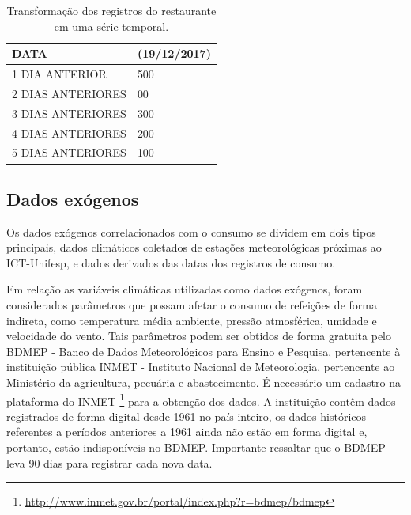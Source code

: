             \begin{table}[!ht]
                \centering
                \begin{tabular}{l|l}
                \hline
                    DATA                  & (19/12/2017) \\ \hline
                1 DIA ANTERIOR    & 500        \\
                2 DIAS ANTERIORES & 00                            \\
                3 DIAS ANTERIORES & 300                            \\
                4 DIAS ANTERIORES & 200                            \\
                5 DIAS ANTERIORES & 100                          \\ \hline 
                \end{tabular}
                \caption{Transformação dos registros do restaurante em uma série temporal.}
                \label{table:transformacaodadosrestaurante}
            \end{table}
           
        \subsection{Dados exógenos} \label{subsec:coleta_exógenos}
            Os dados exógenos correlacionados com o consumo se dividem em dois tipos principais, dados climáticos coletados de estações meteorológicas próximas ao ICT-Unifesp, e dados derivados das datas dos registros de consumo.
    
      	 Em relação as variáveis climáticas utilizadas como dados exógenos, foram considerados parâmetros que possam afetar o consumo de refeições de forma indireta, como temperatura média ambiente, pressão atmosférica, umidade e velocidade do vento. Tais parâmetros podem ser obtidos de forma gratuita pelo BDMEP - Banco de Dados Meteorológicos para Ensino e Pesquisa, pertencente à instituição pública INMET - Instituto Nacional de Meteorologia, pertencente ao Ministério da agricultura, pecuária e abastecimento. É necessário um cadastro na plataforma do INMET \footnote{\url{http://www.inmet.gov.br/portal/index.php?r=bdmep/bdmep}} para a obtenção dos dados. A instituição contêm dados registrados de forma digital desde 1961 no país inteiro, os dados históricos referentes a períodos anteriores a 1961 ainda não estão em forma digital e, portanto, estão indisponíveis no BDMEP. Importante ressaltar que o BDMEP leva 90 dias para registrar cada nova data. 
            	
